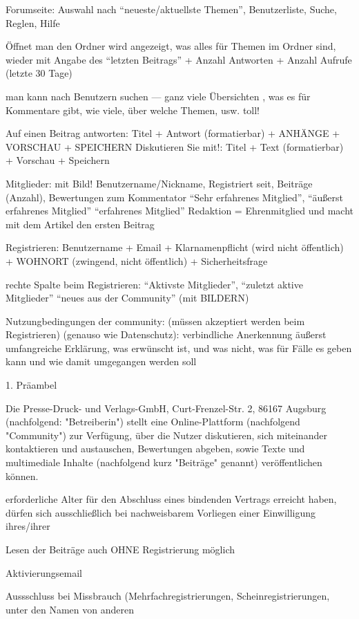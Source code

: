 Forumseite: Auswahl nach ``neueste/aktuellste Themen'', Benutzerliste, Suche, Reglen, Hilfe

Öffnet man den Ordner wird angezeigt, was alles für Themen im Ordner sind, wieder mit Angabe des ``letzten Beitrags'' + Anzahl Antworten + Anzahl Aufrufe (letzte 30 Tage)

man kann nach Benutzern suchen
--- ganz viele Übersichten , was es für Kommentare gibt, wie viele, über welche Themen, usw. toll!

Auf einen Beitrag antworten: Titel + Antwort (formatierbar) + ANHÄNGE + VORSCHAU + SPEICHERN
Diskutieren Sie mit!: Titel + Text (formatierbar) + Vorschau + Speichern

Mitglieder: mit Bild! Benutzername/Nickname, Registriert seit, Beiträge (Anzahl), Bewertungen zum Kommentator ``Sehr erfahrenes Mitglied'',  ``äußerst erfahrenes Mitglied'' ``erfahrenes Mitglied''
Redaktion = Ehrenmitglied und macht mit dem Artikel den ersten Beitrag

Registrieren:
Benutzername + Email + Klarnamenpflicht (wird nicht öffentlich) + WOHNORT (zwingend, nicht öffentlich) + Sicherheitsfrage

rechte Spalte beim Registrieren: ``Aktivste Mitglieder'', ``zuletzt aktive Mitglieder'' ``neues aus der Community'' (mit BILDERN)

Nutzungbedingungen der community: (müssen akzeptiert werden beim Registrieren) (genauso wie Datenschutz):
verbindliche Anerkennung
äußerst umfangreiche Erklärung, was erwünscht ist, und was nicht, was für Fälle es geben kann und wie damit umgegangen werden soll 

1. Präambel

Die Presse-Druck- und Verlags-GmbH, Curt-Frenzel-Str. 2, 86167 Augsburg (nachfolgend: "Betreiberin") stellt eine Online-Plattform (nachfolgend "Community") zur Verfügung, über die Nutzer diskutieren, sich miteinander kontaktieren und austauschen, Bewertungen abgeben, sowie Texte und multimediale Inhalte (nachfolgend kurz "Beiträge" genannt) veröffentlichen können.

erforderliche Alter für den Abschluss eines bindenden Vertrags erreicht haben, dürfen sich ausschließlich bei nachweisbarem Vorliegen einer Einwilligung ihres/ihrer

Lesen der Beiträge auch OHNE Registrierung möglich

Aktivierungsemail

Aussschluss bei Missbrauch (Mehrfachregistrierungen, Scheinregistrierungen, unter den Namen von anderen

